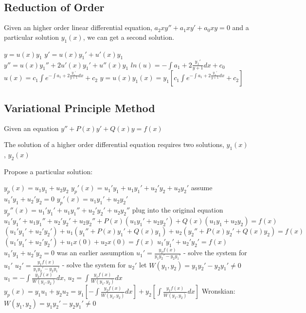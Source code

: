 \documentclass[12 pt, oneside]{book}
\begin{document}
\subsection{Reduction of Order}

Given an higher order linear differential equation, $a_2xy''+a_1xy'+a_0xy=0$ and a particular solution $y_1(x)$, we can get a second solution.

$y=u(x)y_1$\newline{}
$y'=u(x)y_1'+u'(x)y_1$\newline{}
$y''=u(x)y_1''+2u'(x)y_1'+u''(x)y_1$\newline{}
$ln(u)=-\int a_1+2\frac{y_1'}{y+1} dx + c_0$\newline{}
$u(x)=c_1\int e^{-\int a_1+2\frac{y_1'}{y+1} dx}+c_2$\newline{}
$y=u(x)y_1(x)=y_1[c_1\int e^{-\int a_1+2\frac{y_1'}{y+1} dx}+c_2]$

\subsection{Variational Principle Method}

Given an equation $y''+P(x)y'+Q(x)y=f(x)$

The solution of a higher order differential equation requires two solutions, $y_1(x)$, $y_2(x)$

Propose a particular solution:

\begin{mathline}
  $y_p(x)=u_1y_1+u_2y_2$
  $y_p'(x)=u_1'y_1+u_1y_1'+u_2'y_2+u_2y_2'$
  \indent assume $u_1'y_1+u_2'y_2=0$
  $y_p'(x)=u_1y_1'+u_2y_2'$
  $y_p''(x)=u_1'y_1'+u_1y_1''+u_2'y_2'+u_2y_2''$
  plug into the original equation
  $ u_1'y_1'+u_1y_1''+u_2'y_2'+u_2y_2'' + P(x)(u_1y_1'+u_2y_2') + Q(x)(u_1y_1+u_2y_2)=f(x)$
  $(u_1'y_1'+u_2'y_2')+u_1(y_1''+P(x)y_1'+Q(x)y_1)+u_2(y_2''+P(x)y_2'+Q(x)y_2)=f(x)$
  $(u_1'y_1'+u_2'y_2')+u_1x(0)+u_2x(0)=f(x)$
  $u_1'y_1'+u_2'y_2'=f(x)$
  $u_1'y_1+u_2'y_2=0$ was an earlier assumption
  $u_1'=\frac{y_2f(x)}{y_1y_2'-y_2y_1'}$ - solve the system for $u_1'$
  $u_2'=\frac{y_1f(x)}{y_1y_2'-y_2y_1'}$ - solve the system for $u_2'$
  let $W(y_1,y_2)=y_1y_2'-y_2y_1'\neq 0$
  $u_1=-\int\frac{y_2f(x)}{W(y_1,y_2)}dx$, $u_2=\int\frac{y_1f(x)}{W(y_1,y_2)}dx$
  $y_p(x)=y_1u_1+y_2u_2=y_1[-\int\frac{y_2f(x)}{W(y_1,y_2)}dx]+y_2[\int\frac{y_1f(x)}{W(y_1,y_2)}dx]$
  Wronskian: $W(y_1,y_2)=y_1y_2'-y_2y_1'\neq 0$
  
\end{mathline}
\end{document}
